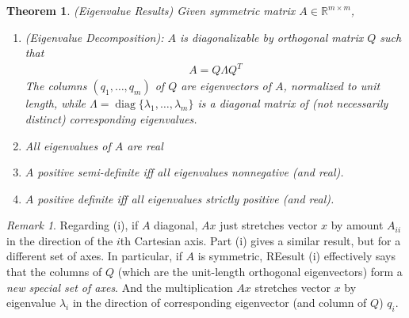 \documentclass[12pt]{book}
\numberwithin{equation}{section} %
\theoremstyle{plain}
\newtheorem{thm}{Theorem}[section]
\theoremstyle{definition}
\theoremstyle{remark}
\newtheorem*{rmk}{Remark}
\newcommand{\diag}{\operatorname{diag}}
\newcommand{\Rmm}{\mathbb{R}^{m\times m}}
\begin{document}
\begin{thm}\emph{(Eigenvalue Results)}
\label{thm:symmetric-eig}
Given symmetric matrix $A\in\Rmm$,
\begin{enumerate}[label=\emph{(\roman*)}]
  \item
    \emph{(Eigenvalue Decomposition):}
    $A$ is diagonalizable by orthogonal matrix $Q$ such that
    \begin{align*}
      A = Q\Lambda Q^T
    \end{align*}
    The columns $(q_1,\ldots,q_m)$ of $Q$ are eigenvectors of $A$,
    normalized to unit length, while
    $\Lambda=\diag\{\lambda_1,\ldots,\lambda_m\}$ is a diagonal matrix
    of (not necessarily distinct) corresponding eigenvalues.
  \item All eigenvalues of $A$ are \emph{real}
  \item $A$ positive semi-definite iff all eigenvalues nonnegative (and
    real).
  \item $A$ positive definite iff all eigenvalues strictly positive (and
    real).
\end{enumerate}

\end{thm}
\begin{rmk}
Regarding (i),
if $A$ diagonal, $Ax$ just stretches vector $x$ by amount $A_{ii}$ in
the direction of the $i$th Cartesian axis.
Part (i) gives a similar result, but for a different set of axes.  In
particular, if $A$ is symmetric, REesult (i) effectively says that the
columns of $Q$ (which are the unit-length orthogonal eigenvectors) form
a \emph{new special set of axes}. And the multiplication $Ax$ stretches
vector $x$ by eigenvalue $\lambda_i$ in the direction of corresponding
eigenvector (and column of $Q$) $q_i$.
\end{rmk}
\end{document}
